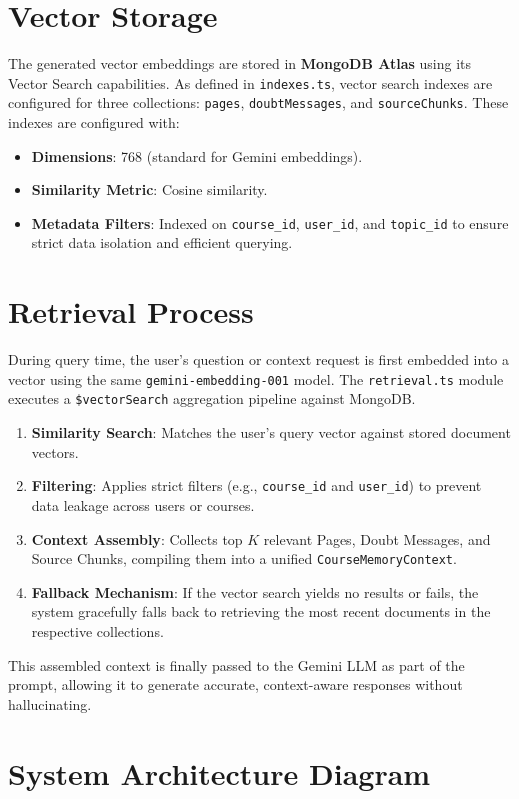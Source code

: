 \documentclass[11pt,a4paper]{article}
\begin{document}
\section{Vector Storage}
The generated vector embeddings are stored in \textbf{MongoDB Atlas} using its Vector Search capabilities. 
As defined in \texttt{indexes.ts}, vector search indexes are configured for three collections: \texttt{pages}, \texttt{doubtMessages}, and \texttt{sourceChunks}.
These indexes are configured with:
\begin{itemize}
    \item \textbf{Dimensions}: 768 (standard for Gemini embeddings).
    \item \textbf{Similarity Metric}: Cosine similarity.
    \item \textbf{Metadata Filters}: Indexed on \texttt{course\_id}, \texttt{user\_id}, and \texttt{topic\_id} to ensure strict data isolation and efficient querying.
\end{itemize}

\section{Retrieval Process}
During query time, the user's question or context request is first embedded into a vector using the same \texttt{gemini-embedding-001} model. 
The \texttt{retrieval.ts} module executes a \texttt{\$vectorSearch} aggregation pipeline against MongoDB. 
\begin{enumerate}
    \item \textbf{Similarity Search}: Matches the user's query vector against stored document vectors.
    \item \textbf{Filtering}: Applies strict filters (e.g., \texttt{course\_id} and \texttt{user\_id}) to prevent data leakage across users or courses.
    \item \textbf{Context Assembly}: Collects top $K$ relevant Pages, Doubt Messages, and Source Chunks, compiling them into a unified \texttt{CourseMemoryContext}.
    \item \textbf{Fallback Mechanism}: If the vector search yields no results or fails, the system gracefully falls back to retrieving the most recent documents in the respective collections.
\end{enumerate}
This assembled context is finally passed to the Gemini LLM as part of the prompt, allowing it to generate accurate, context-aware responses without hallucinating.

\section{System Architecture Diagram}
\end{document}
